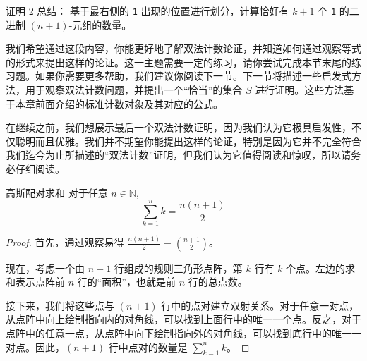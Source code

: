 \begin{questions}{证明 2 总结：}
    基于最右侧的 \verb|1| 出现的位置进行划分，计算恰好有 $k + 1$ 个 \verb|1| 的二进制 $(n+1)$-元组的数量。
\end{questions}

我们希望通过这段内容，你能更好地了解双法计数论证，并知道如何通过观察等式的形式来提出这样的论证。这一主题需要一定的练习，请你尝试完成本节末尾的练习题。如果你需要更多帮助，我们建议你阅读下一节。下一节将描述一些启发式方法，用于观察双法计数问题，并提出一个``恰当''的集合 $S$ 进行证明。这些方法基于本章前面介绍的标准计数对象及其对应的公式。

在继续之前，我们想展示最后一个双法计数证明，因为我们认为它极具启发性，不仅聪明而且优雅。我们并不期望你能提出这样的论证，特别是因为它并不完全符合我们迄今为止所描述的``双法计数''证明，但我们认为它值得阅读和惊叹，所以请务必仔细阅读。

\begin{proposition}{高斯配对求和}
    对于任意 $n \in \mathbb{N}$,
    \[\sum_{k=1}^{n} k = \frac{n(n+1)}{2}\]
\end{proposition}

\begin{proof}
    首先，通过观察易得 $\frac{n(n+1)}{2} = {n+1 \choose 2}$。

    现在，考虑一个由 $n + 1$ 行组成的规则三角形点阵，第 $k$ 行有 $k$ 个点。左边的求和表示点阵前 $n$ 行的``面积''，也就是前 $n$ 行的总点数。

    接下来，我们将这些点与 $(n+1)$ 行中的点对建立双射关系。对于任意一对点，从点阵中向上绘制指向内的对角线，可以找到上面行中的唯一一个点。反之，对于点阵中的任意一点，从点阵中向下绘制指向外的对角线，可以找到底行中的唯一一对点。因此，$(n + 1)$ 行中点对的数量是 $\sum_{k=1}^n k$。
\end{proof}